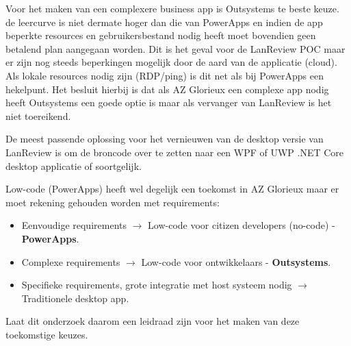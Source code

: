 Voor het maken van een complexere business app is Outsystems te beste keuze. de leercurve is niet dermate hoger dan die van PowerApps en indien de app beperkte resources en gebruikersbestand nodig heeft moet bovendien geen betalend plan aangegaan worden. Dit is het geval voor de LanReview POC maar er zijn nog steeds beperkingen mogelijk door de aard van de applicatie (cloud). Als lokale resources nodig zijn (RDP/ping) is dit net als bij PowerApps een hekelpunt. Het besluit hierbij is dat als AZ Glorieux een complexe app nodig heeft Outsystems een goede optie is maar als vervanger van LanReview is het niet toereikend.

De meest passende oplossing voor het vernieuwen van de desktop versie van LanReview is om de broncode over te zetten naar een WPF of UWP .NET Core desktop applicatie of soortgelijk. 

Low-code (PowerApps) heeft wel degelijk een toekomst in AZ Glorieux maar er moet rekening gehouden worden met requirements:
\begin{itemize}
    \item Eenvoudige requirements $\rightarrow$ Low-code voor citizen developers (no-code) - \textbf{PowerApps}.
    \item Complexe requirements $\rightarrow$ Low-code voor ontwikkelaars - \textbf{Outsystems}.
    \item Specifieke requirements, grote integratie met host systeem nodig $\rightarrow$ Traditionele desktop app.
\end{itemize}

Laat dit onderzoek daarom een leidraad zijn voor het maken van deze toekomstige keuzes.